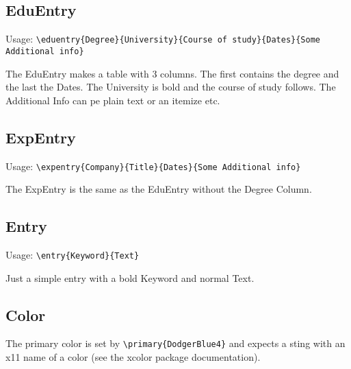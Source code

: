 \documentclass{customcv}
\begin{document}
\subsection{EduEntry}

Usage:
\texttt{\textbackslash{}eduentry\{Degree\}\{University\}\{Course of study\}\{Dates\}\{Some Additional info\}}

The EduEntry makes a table with 3 columns.
The first contains the degree and the last the Dates.
The University is bold and the course of study follows.
The Additional Info can pe plain text or an itemize etc.

\subsection{ExpEntry}

Usage:
\texttt{\textbackslash{}expentry\{Company\}\{Title\}\{Dates\}\{Some Additional info\}}

The ExpEntry is the same as the EduEntry without the Degree Column.

\subsection{Entry}

Usage:
\texttt{\textbackslash{}entry\{Keyword\}\{Text\}}

Just a simple entry with a bold Keyword and normal Text.


\subsection{Color}

The primary color is set by \texttt{\textbackslash{}primary\{DodgerBlue4\}} and
expects a sting with an x11 name of a color (see the xcolor package documentation).
\end{document}
